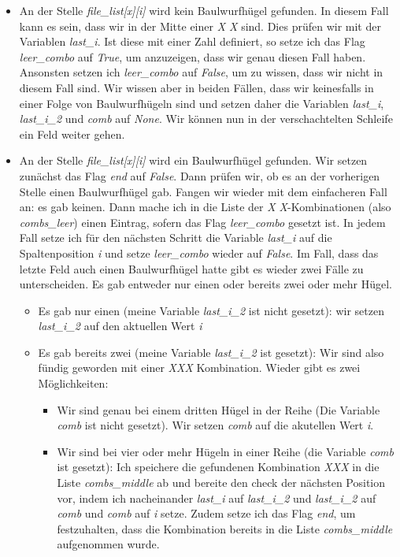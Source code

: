 \documentclass[a4paper,10pt,ngerman]{scrartcl}
\begin{document}
\begin{itemize}
    \item An der Stelle \textit{file\_list[x][i]} wird kein Baulwurfhügel gefunden. In diesem Fall kann es sein, dass wir in der Mitte einer \textit{X X} sind. Dies prüfen wir mit der Variablen \textit{last\_i}. Ist diese mit einer Zahl definiert, so setze ich das Flag \textit{leer\_combo} auf \textit{True}, um anzuzeigen, dass wir genau diesen Fall haben. Ansonsten setzen ich \textit{leer\_combo} auf \textit{False}, um zu wissen, dass wir nicht in diesem Fall sind. Wir wissen aber in beiden Fällen, dass wir keinesfalls in einer Folge von Baulwurfhügeln sind und setzen daher die Variablen \textit{last\_i}, \textit{last\_i\_2} und \textit{comb} auf \textit{None}. Wir können nun in der verschachtelten Schleife ein Feld weiter gehen.
\item An der Stelle \textit{file\_list[x][i]} wird ein Baulwurfhügel gefunden.
Wir setzen zunächst das Flag \textit{end} auf \textit{False}. Dann prüfen wir, ob es an der vorherigen Stelle einen Baulwurfhügel gab. Fangen wir wieder mit dem einfacheren Fall an: es gab keinen. Dann mache ich in die Liste der \textit{X X}-Kombinationen (also \textit{combs\_leer}) einen Eintrag, sofern das Flag \textit{leer\_combo} gesetzt ist. In jedem Fall setze ich für den nächsten Schritt die Variable \textit{last\_i} auf die Spaltenposition \textit{i} und setze \textit{leer\_combo} wieder auf \textit{False}. 
Im Fall, dass das letzte Feld auch einen Baulwurfhügel hatte gibt es wieder zwei Fälle zu unterscheiden. Es gab entweder nur einen  oder bereits zwei oder mehr Hügel.  
\begin{itemize}
    \item Es gab nur einen (meine Variable \textit{last\_i\_2} ist nicht gesetzt): wir setzen \textit{last\_i\_2} auf den aktuellen Wert \textit{i}
    \item Es gab bereits zwei (meine Variable \textit{last\_i\_2} ist gesetzt): Wir sind also fündig geworden mit einer \textit{XXX} Kombination. Wieder gibt es zwei Möglichkeiten: 
    \begin{itemize}
        \item Wir sind genau bei einem dritten Hügel in der Reihe (Die Variable \textit{comb} ist nicht gesetzt). Wir setzen \textit{comb} auf die akutellen Wert \textit{i}. 
        \item Wir sind bei vier oder mehr Hügeln in einer Reihe (die Variable \textit{comb} ist gesetzt):  Ich speichere die gefundenen Kombination \textit{XXX} in die Liste \textit{combs\_middle} ab und bereite den check der nächsten Position vor, indem ich nacheinander \textit{last\_i} auf \textit{last\_i\_2} und \textit{last\_i\_2} auf \textit{comb} und \textit{comb} auf \textit{i} setze. Zudem setze ich das Flag \textit{end}, um festzuhalten, dass die Kombination bereits in die Liste \textit{combs\_middle} aufgenommen wurde. 

\end{itemize}
\end{itemize}
\end{itemize}
\end{document}
